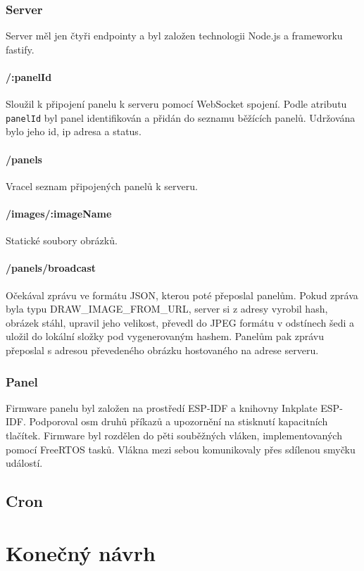 \subsubsection{Server}
Server měl jen čtyři endpointy a byl založen technologii Node.js a frameworku fastify.

\paragraph*{/:panelId} Sloužil k připojení panelu k serveru pomocí WebSocket spojení. Podle atributu \lstinline{panelId} byl panel identifikován a přidán do seznamu běžících panelů. Udržována bylo jeho id, ip adresa a status.
\paragraph*{/panels} Vracel seznam připojených panelů k serveru.
\paragraph*{/images/:imageName} Statické soubory obrázků.
\paragraph*{/panels/broadcast} Očekával zprávu ve formátu JSON, kterou poté přeposlal panelům. Pokud zpráva byla typu DRAW\_IMAGE\_FROM\_URL, server si z adresy vyrobil hash, obrázek stáhl, upravil jeho velikost, převedl do JPEG formátu v odstínech šedi a uložil do lokální složky pod vygenerovaným hashem. Panelům pak zprávu přeposlal s adresou převedeného obrázku hostovaného na adrese serveru.

\subsubsection{Panel}
Firmware panelu byl založen na prostředí ESP-IDF a knihovny Inkplate ESP-IDF. Podporoval osm druhů příkazů a upozornění na stisknutí kapacitních tlačítek. Firmware byl rozdělen do pěti souběžných vláken, implementovaných pomocí FreeRTOS tasků. Vlákna mezi sebou komunikovaly přes sdílenou smyčku událostí.

\subsection{Cron}

\section{Konečný návrh}


